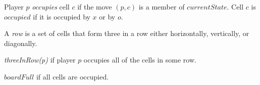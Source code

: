 \documentclass{led_doc}
\begin{document}
\begin{ledDef}
\end{ledDef}

\begin{ledCmnt}
Player $p$ {\em occupies} cell $c$ if the move $(p,c)$ is a member of $currentState$.
Cell $c$ is $occupied$ if it is occupied by $x$ or by $o$.
\end{ledCmnt}

\begin{ledDef}
\end{ledDef}

\begin{ledDef}
\end{ledDef}

\begin{ledCmnt}
A {\em row} is a set of cells that form three in a row either horizontally, vertically, or diagonally.
\end{ledCmnt}

\begin{ledDef}
\end{ledDef}

\begin{ledCmnt}
{\em threeInRow(p)} if player $p$ occupies all of the cells in some row.
\end{ledCmnt}

\begin{ledDef}
\end{ledDef}

\begin{ledCmnt}
$boardFull$ if all cells are occupied.
\end{ledCmnt}

\begin{ledDef}
\end{ledDef}
\end{document}
